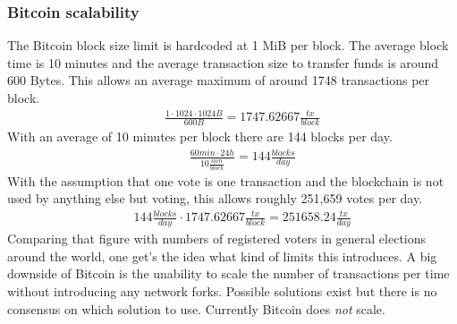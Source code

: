 \documentclass[9pt,oneside]{amsart}
\begin{document}
\begin{multicols}{2}
\subsubsection{Bitcoin scalability}
The Bitcoin block size limit is hardcoded at 1 MiB per block. The average block time is 10 minutes and the average transaction size to transfer funds is around 600 Bytes. This allows an average maximum of around 1748 transactions per block.
\begin{eqnarray}
& & \frac{1 \cdot 1024 \cdot 1024 B}{600 B} = 1747.62667 \frac {tx} {block}
\end{eqnarray}
With an average of 10 minutes per block there are 144 blocks per day.
\begin{eqnarray}
& & \frac{60 min \cdot 24 h}{10 \frac{min}{block}} = 144 \frac {blocks}{day}
\end{eqnarray}
With the assumption that one vote is one transaction and the blockchain is not used by anything else but voting, this allows roughly 251,659 votes per day.
\begin{eqnarray}
& & 144 \frac {blocks}{day} \cdot 1747.62667 \frac {tx} {block} = 251658.24 \frac{tx}{day}
\end{eqnarray}
Comparing that figure with numbers of registered voters in general elections around the world, one get's the idea what kind of limits this introduces. A big downside of Bitcoin is the unability to scale the number of transactions per time without introducing any network forks. Possible solutions exist but there is no consensus on which solution to use. Currently Bitcoin does \textit{not} scale.

\end{multicols}
\end{document}
